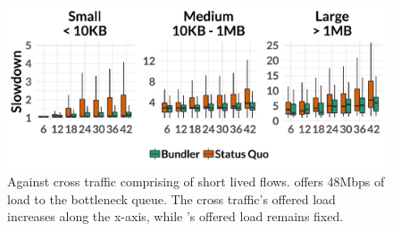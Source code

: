 \begin{figure}
    \centering
\begin{knitrout}
\color{fgcolor}
\includegraphics[width=\maxwidth]{figure/robust:cr-inelastic-1} 

\end{knitrout}
    \caption{Against cross traffic comprising of short lived flows. \name offers 48Mbps of load to the bottleneck queue. The cross traffic's offered load increases along the x-axis, while \name{}'s offered load remains fixed.}
    \label{fig:robust:cr-inelastic}
\end{figure}
